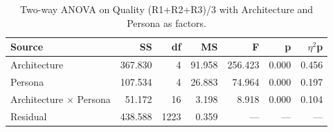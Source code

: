 \begin{table}[htbp]
\centering
\caption{Two-way ANOVA on Quality (R1+R2+R3)/3 with Architecture and Persona as factors.}
\label{tab:anova-quality}
\begin{tabular}{lrrrrrr}
\toprule
Source & SS & df & MS & F & p & $\eta$$^2$p \\
\midrule
Architecture & 367.830 & 4 & 91.958 & 256.423 & 0.000 & 0.456 \\
Persona & 107.534 & 4 & 26.883 & 74.964 & 0.000 & 0.197 \\
Architecture $\times$ Persona & 51.172 & 16 & 3.198 & 8.918 & 0.000 & 0.104 \\
Residual & 438.588 & 1223 & 0.359 & --- & --- & --- \\
\bottomrule
\end{tabular}
\end{table}
